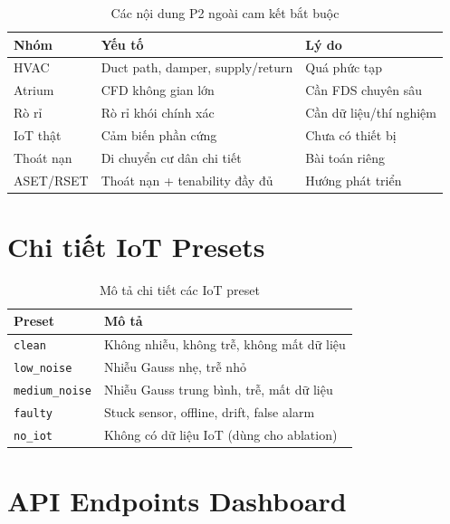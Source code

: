 \begin{appendices}
\begin{table}[H]
\centering
\caption{Các nội dung P2 ngoài cam kết bắt buộc}
\label{tab:factorP2}
\begin{tabularx}{\textwidth}{l l X}
\toprule
\textbf{Nhóm} & \textbf{Yếu tố} & \textbf{Lý do} \\
\midrule
HVAC      & Duct path, damper, supply/return & Quá phức tạp \\
Atrium    & CFD không gian lớn              & Cần FDS chuyên sâu \\
Rò rỉ     & Rò rỉ khói chính xác            & Cần dữ liệu/thí nghiệm \\
IoT thật  & Cảm biến phần cứng              & Chưa có thiết bị \\
Thoát nạn & Di chuyển cư dân chi tiết       & Bài toán riêng \\
ASET/RSET & Thoát nạn + tenability đầy đủ  & Hướng phát triển \\
\bottomrule
\end{tabularx}
\end{table}


\chapter{Chi tiết IoT Presets}
\label{app:iotpresets}

\begin{table}[H]
\centering
\caption{Mô tả chi tiết các IoT preset}
\label{tab:iotpresets_detail}
\begin{tabularx}{\textwidth}{l X}
\toprule
\textbf{Preset} & \textbf{Mô tả} \\
\midrule
\texttt{clean}        & Không nhiễu, không trễ, không mất dữ liệu \\
\texttt{low\_noise}    & Nhiễu Gauss nhẹ, trễ nhỏ \\
\texttt{medium\_noise} & Nhiễu Gauss trung bình, trễ, mất dữ liệu \\
\texttt{faulty}        & Stuck sensor, offline, drift, false alarm \\
\texttt{no\_iot}       & Không có dữ liệu IoT (dùng cho ablation) \\
\bottomrule
\end{tabularx}
\end{table}


\chapter{API Endpoints Dashboard}
\label{app:api}


\end{appendices}
